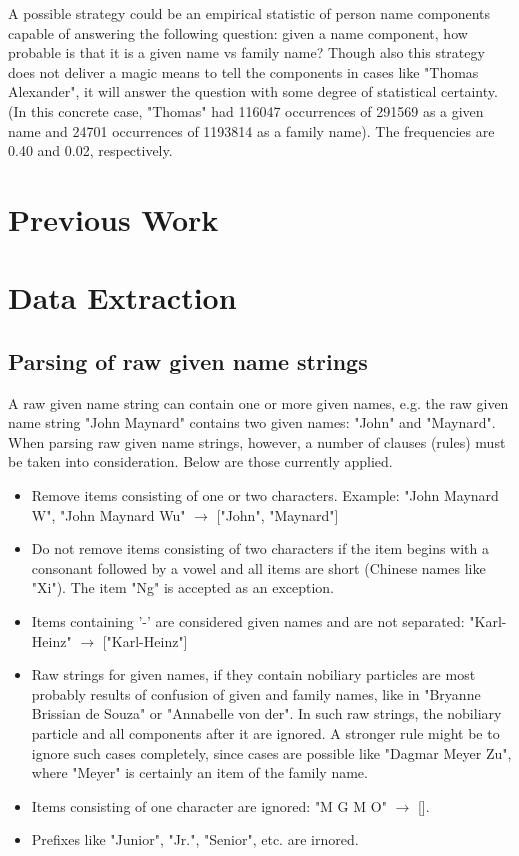 \documentclass[12pt,a4paper]{article}
\newcommand{\gn}{given name\xspace}
\newcommand{\fn}{family name\xspace}
\begin{document}
	A possible strategy could be an empirical statistic of person name components capable of answering the following question: given a name component, how probable is that it is a \gn vs \fn? Though also this strategy does not deliver a magic means to tell the components in cases like "Thomas Alexander", it will answer the question with some degree of statistical certainty. (In this concrete case, "Thomas" had 116047 occurrences of 291569 as a given name and 24701 occurrences of 1193814 as a family name). The frequencies are 0.40 and 0.02, respectively. 
	
	\section{Previous Work}
	
	\section{Data Extraction}
		\subsection{Parsing of raw given name strings}
		A raw given name string can contain one or more given names, e.g. the raw given name string "John Maynard" contains two given names: "John" and "Maynard". When parsing raw given name strings, however, a number of clauses (rules) must be taken into consideration. Below are those currently applied.
		\begin{itemize}
			\item Remove items consisting of one or two characters. Example: "John Maynard W", "John Maynard Wu" $ \rightarrow $ ["John", "Maynard"]
			\item Do not remove items consisting of two characters if the item begins with a consonant followed by a vowel and all items are short (Chinese names like "Xi"). The item "Ng" is accepted as an exception.
			\item Items containing '-' are considered given names and are not separated: "Karl-Heinz" $ \rightarrow $ ["Karl-Heinz"]
			\item Raw strings for given names, if they contain nobiliary particles are most probably results of confusion of given and family names, like in "Bryanne Brissian de Souza" or "Annabelle von der". In such raw strings, the nobiliary particle and all components after it are ignored. A stronger rule might be to ignore such cases completely, since cases are possible like "Dagmar Meyer Zu", where "Meyer" is certainly an item of the family name.
			\item Items consisting of one character are ignored: "M G M O" $ \rightarrow $ [].
			\item Prefixes like "Junior", "Jr.", "Senior", etc. are irnored.
		\end{itemize}
	
\end{document}
